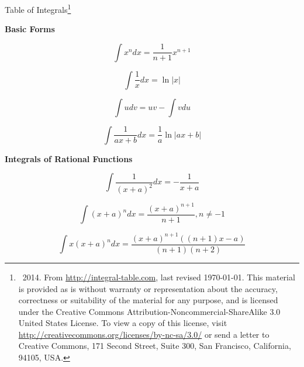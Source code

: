 \documentclass[11pt,twoside]{article}
\date{} %
\begin{document}
\begin{center}
\LARGE
Table of Integrals\footnote{\textcopyleft \ 2014. From  \url{http://integral-table.com}, last revised \today. This material
is provided as is without warranty or representation about the accuracy, correctness or suitability of the material for any purpose, and is licensed under the Creative Commons Attribution-Noncommercial-ShareAlike 3.0 United States License. To view a copy of this license, visit \url{http://creativecommons.org/licenses/by-nc-sa/3.0/} or send a letter to Creative Commons, 171 Second Street, Suite 300, San Francisco, California, 94105, USA. }



\end{center}
\normalsize
\begin{multicols}{3}

\begin{footnotesize}
\begin{center} \textbf{Basic Forms}
\end{center}

\begin{equation}
\int x^n dx = \frac{1}{n+1}x^{n+1}
\end{equation}

\begin{equation}
\int \frac{1}{x}dx = \ln |x|
\end{equation}

\begin{equation}
\int u dv = uv - \int v du
\end{equation}

\begin{equation}
\int \frac{1}{ax+b}dx = \frac{1}{a} \ln |ax + b|
\end{equation}

\begin{center} \textbf {Integrals of Rational Functions} \end{center}

\begin{equation}
\int \frac{1}{(x+a)^2}dx = -\frac{1}{x+a}
\end{equation}

\begin{equation}
\int (x+a)^n dx = \frac{(x+a)^{n+1}}{n+1}, n\ne -1
\end{equation}

\begin{equation}
\int x(x+a)^n dx = \frac{(x+a)^{n+1} ( (n+1)x-a)}{(n+1)(n+2)}
\end{equation}


\end{footnotesize}
\end{multicols}
\end{document}
